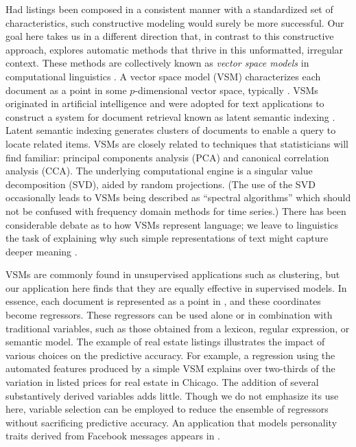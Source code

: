 \documentclass[12pt]{article}
\begin{document}
 Had listings been composed in a consistent manner with a standardized set of
 characteristics, such constructive modeling would surely be more successful.
  Our goal here takes us in a different direction that, in contrast to this
 constructive approach, explores automatic methods that thrive in this
 unformatted, irregular context.  These methods are collectively known as {\em
 vector space models} in computational linguistics \citep[e.g.][]{turney10}.  A
 vector space model (VSM) characterizes each document as a point in some
 $p$-dimensional vector space, typically \Rp.  VSMs originated in artificial
 intelligence and were adopted for text applications to construct a system for
 document retrieval known as latent semantic indexing \citep{deerwester88}.
  Latent semantic indexing generates clusters of documents to enable a query to locate
 related items.  VSMs are closely related to techniques that statisticians will
 find familiar: principal components analysis (PCA) and canonical correlation
 analysis (CCA).  The underlying computational engine is a singular value
 decomposition (SVD), aided by random projections.  (The use of the SVD
 occasionally leads to VSMs being described as ``spectral algorithms'' which
 should not be confused with frequency domain methods for time series.)  There
 has been considerable debate as to how VSMs represent language; we leave to
 linguistics the task of explaining why such simple representations of text
 might capture deeper meaning \citep{deerwester90, landauer97, bullinaria07,
 turney10}.


 VSMs are commonly found in unsupervised applications such as clustering, but
 our application here finds that they are equally effective in supervised
 models.  In essence, each document is represented as a point in \Rp, and these
 coordinates become regressors.  These regressors can be used alone or in
 combination with traditional variables, such as those obtained from a lexicon,
 regular expression, or semantic model.  The example of real estate listings
 illustrates the impact of various choices on the predictive accuracy.  For
 example, a regression using the automated features produced by a simple VSM
 explains over two-thirds of the variation in listed prices for real estate in
 Chicago.  The addition of several substantively derived variables adds little.
  Though we do not emphasize its use here, variable selection can be employed to
 reduce the ensemble of regressors without sacrificing predictive accuracy.  An
 application that models personality traits derived from Facebook messages
 appears in \citet{ungar13}.
\end{document}
